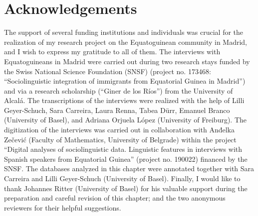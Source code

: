 \documentclass[output=paper]{langscibook}
\begin{document}
\section*{Acknowledgements}
The support of several funding institutions and individuals was crucial for the realization of my research project on the Equatoguinean community in Madrid, and I wish to express my gratitude to all of them. The interviews with Equatoguineans in Madrid were carried out during two research stays funded by the Swiss National Science Foundation (SNSF) (project no. 173468: “Sociolinguistic integration of immigrants from Equatorial Guinea in Madrid”) and via a research scholarship (“Giner de los Ríos”) from the University of Alcalá. The transcriptions of the interviews were realized with the help of Lilli Geyer-Schuch, Sara Carreira, Laura Renna, Tabea Dürr, Emanuel Branco (University of Basel), and Adriana Orjuela López (University of Freiburg). The digitization of the interviews was carried out in collaboration with Anđelka Zečević (Faculty of Mathematics, University of Belgrade) within the project “Digital analyses of sociolinguistic data. Linguistic features in interviews with Spanish speakers from Equatorial Guinea” (project no. 190022) financed by the SNSF. The databases analyzed in this chapter were annotated together with Sara Carreira and Lilli Geyer-Schuch (University of Basel). Finally, I would like to thank Johannes Ritter (University of Basel) for his valuable support during the preparation and careful revision of this chapter; and the two anonymous reviewers for their helpful suggestions.


\printbibliography[heading=subbibliography, notkeyword=this]
\end{document}
